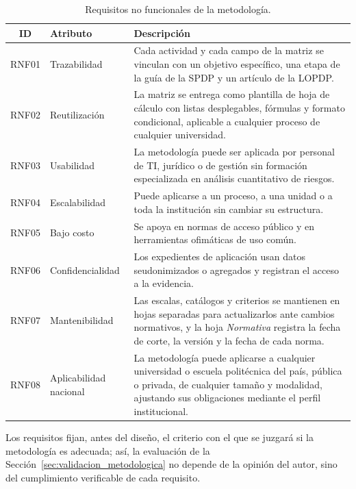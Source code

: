 \begin{table}[htbp]
  \centering
  \caption{Requisitos no funcionales de la metodología.}
  \label{tab:rnf}
  \footnotesize
  \renewcommand{\arraystretch}{1.2}
  \begin{tabularx}{\textwidth}{|c|p{2.8cm}|L|}
    \hline
    \textbf{ID} & \textbf{Atributo} & \textbf{Descripción} \\
    \hline
    RNF01 & Trazabilidad & Cada actividad y cada campo de la matriz se vinculan con un objetivo específico, una etapa de la guía de la SPDP y un artículo de la LOPDP. \\
    \hline
    RNF02 & Reutilización & La matriz se entrega como plantilla de hoja de cálculo con listas desplegables, fórmulas y formato condicional, aplicable a cualquier proceso de cualquier universidad. \\
    \hline
    RNF03 & Usabilidad & La metodología puede ser aplicada por personal de TI, jurídico o de gestión sin formación especializada en análisis cuantitativo de riesgos. \\
    \hline
    RNF04 & Escalabilidad & Puede aplicarse a un proceso, a una unidad o a toda la institución sin cambiar su estructura. \\
    \hline
    RNF05 & Bajo costo & Se apoya en normas de acceso público y en herramientas ofimáticas de uso común. \\
    \hline
    RNF06 & Confidencialidad & Los expedientes de aplicación usan datos seudonimizados o agregados y registran el acceso a la evidencia. \\
    \hline
    RNF07 & Mantenibilidad & Las escalas, catálogos y criterios se mantienen en hojas separadas para actualizarlos ante cambios normativos, y la hoja \textit{Normativa} registra la fecha de corte, la versión y la fecha de cada norma. \\
    \hline
    RNF08 & Aplicabilidad nacional & La metodología puede aplicarse a cualquier universidad o escuela politécnica del país, pública o privada, de cualquier tamaño y modalidad, ajustando sus obligaciones mediante el perfil institucional. \\
    \hline
  \end{tabularx}
  \raggedright
\end{table}



Los requisitos fijan, antes del diseño, el criterio con el que se juzgará si la metodología es adecuada; así, la evaluación de la Sección~\ref{sec:validacion_metodologica} no depende de la opinión del autor, sino del cumplimiento verificable de cada requisito.

